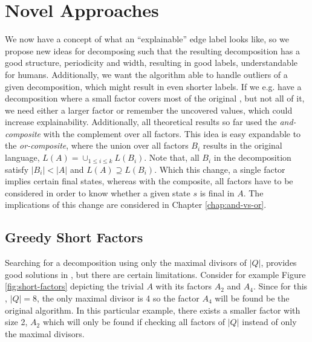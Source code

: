\chapter{Novel Approaches}
\label{chap:novel-algos}
We now have a concept of what an \enquote{explainable} edge label looks like, so we propose new ideas for decomposing \DFAs such that the resulting decomposition has a good structure, periodicity and width, resulting in good labels, understandable for humans. Additionally, we want the algorithm able to handle outliers of a given decomposition, which might result in even shorter labels. If we e.g. have a decomposition where a small factor covers most of the original \DFA, but not all of it, we need either a larger factor or remember the uncovered values, which could increase explainability. Additionally, all theoretical results so far used the \textit{and-composite} with the complement over all factors. This idea is easy expandable to the \textit{or-composite}, where the union over all factors $B_i$ results in the original language, $L(A) = \cup_{1\leq i \leq k} L(B_i)$. Note that, all $B_i$ in the decomposition satisfy $|B_i| < |A|$ and $L(A) \supseteq L(B_i)$. Which this change, a single factor implies certain final states, whereas with the composite, all factors have to be considered in order to know whether a given state $s$ is final in $A$. The implications of this change are considered in Chapter \ref{chap:and-vs-or}.

\section{Greedy Short Factors}
Searching for a decomposition using only the maximal divisors of $|Q|$, provides good solutions in \LogSpace, but there are certain limitations. Consider for example Figure \ref{fig:short-factors} depicting the trivial \DFA $A$ with its factors $A_2$ and $A_4$. Since for this \DFA, $|Q| = 8$, the only maximal divisor is 4 so the factor $A_4$ will be found be the original algorithm. In this particular example, there exists a smaller factor with size 2, $A_2$ which will only be found if checking all factors of $|Q|$ instead of only the maximal divisors.

